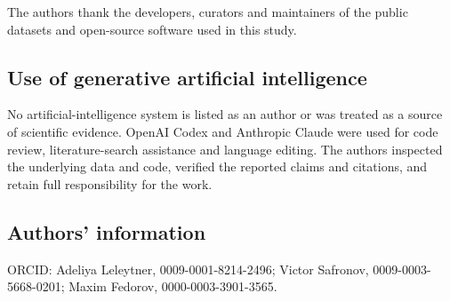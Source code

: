 The authors thank the developers, curators and maintainers of the public
datasets and open-source software used in this study.

\subsection*{Use of generative artificial intelligence}

No artificial-intelligence system is listed as an author or was treated as a
source of scientific evidence.  OpenAI Codex and Anthropic Claude were used for
code review, literature-search assistance and language editing.  The authors
inspected the underlying data and code, verified the reported claims and
citations, and retain full responsibility for the work.

\subsection*{Authors' information}

ORCID: Adeliya Leleytner, 0009-0001-8214-2496; Victor Safronov,
0009-0003-5668-0201; Maxim Fedorov, 0000-0003-3901-3565.

